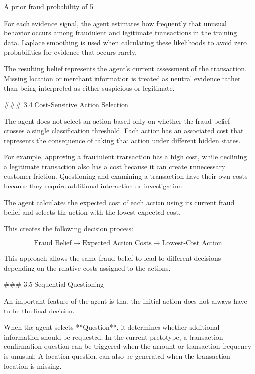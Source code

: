 A prior fraud probability of 5%

For each evidence signal, the agent estimates how frequently that unusual behavior occurs among fraudulent and legitimate transactions in the training data. Laplace smoothing is used when calculating these likelihoods to avoid zero probabilities for evidence that occurs rarely.

The resulting belief represents the agent's current assessment of the transaction. Missing location or merchant information is treated as neutral evidence rather than being interpreted as either suspicious or legitimate.

### 3.4 Cost-Sensitive Action Selection

The agent does not select an action based only on whether the fraud belief crosses a single classification threshold. Each action has an associated cost that represents the consequence of taking that action under different hidden states.

For example, approving a fraudulent transaction has a high cost, while declining a legitimate transaction also has a cost because it can create unnecessary customer friction. Questioning and examining a transaction have their own costs because they require additional interaction or investigation.

The agent calculates the expected cost of each action using its current fraud belief and selects the action with the lowest expected cost.

This creates the following decision process:

$$
\text{Fraud Belief}
\rightarrow
\text{Expected Action Costs}
\rightarrow
\text{Lowest-Cost Action}
$$

This approach allows the same fraud belief to lead to different decisions depending on the relative costs assigned to the actions.

### 3.5 Sequential Questioning

An important feature of the agent is that the initial action does not always have to be the final decision.

When the agent selects **Question**, it determines whether additional information should be requested. In the current prototype, a transaction confirmation question can be triggered when the amount or transaction frequency is unusual. A location question can also be generated when the transaction location is missing.

